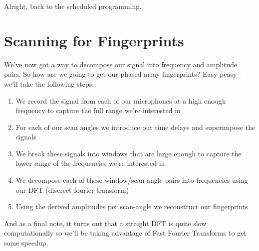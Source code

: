 \documentclass[12pt,a6paper]{book}
\begin{document}
Alright, back to the scheduled programming. 

\section{Scanning for Fingerprints}
We've now got a way to decompose our signal into frequency and amplitude pairs. So how are we going to get our phased array fingerprints? Easy peasy - we'll take the following steps:

\begin{enumerate}
\item We record the signal from each of our microphones at a high enough frequency to capture the full range we're interested in
\item For each of our scan angles we introduce our time delays and superimpose the signals
\item We break these signals into windows that are large enough to capture the lower range of the frequencies we're interested in
\item We decompose each of these window/scan-angle pairs into frequencies using our DFT (discreet fourier transform)
\item Using the derived amplitudes per scan-angle we reconstruct our fingerprints
\end{enumerate}

And as a final note, it turns out that a straight DFT is quite slow computationally so we'll be taking advantage of Fast Fourier Transforms to get some speedup.  

\newpage



\end{document}
